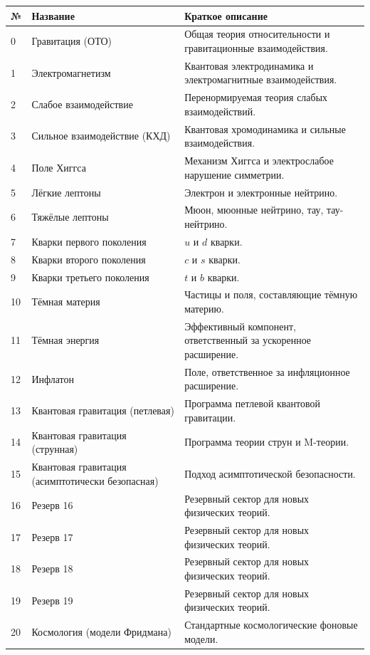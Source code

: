 \documentclass[11pt,a4paper]{article}
\begin{document}
	\begin{longtable}{|p{0.9cm}|p{6.0cm}|p{8.6cm}|}
		\hline
		\textbf{№} & \textbf{Название} & \textbf{Краткое описание} \\
		\hline
		\endhead
		0 & Гравитация (ОТО) & Общая теория относительности и гравитационные взаимодействия. \\
		1 & Электромагнетизм & Квантовая электродинамика и электромагнитные взаимодействия. \\
		2 & Слабое взаимодействие & Перенормируемая теория слабых взаимодействий. \\
		3 & Сильное взаимодействие (КХД) & Квантовая хромодинамика и сильные взаимодействия. \\
		4 & Поле Хиггса & Механизм Хиггса и электрослабое нарушение симметрии. \\
		5 & Лёгкие лептоны & Электрон и электронные нейтрино. \\
		6 & Тяжёлые лептоны & Мюон, мюонные нейтрино, тау, тау-нейтрино. \\
		7 & Кварки первого поколения & $u$ и $d$ кварки. \\
		8 & Кварки второго поколения & $c$ и $s$ кварки. \\
		9 & Кварки третьего поколения & $t$ и $b$ кварки. \\
		10 & Тёмная материя & Частицы и поля, составляющие тёмную материю. \\
		11 & Тёмная энергия & Эффективный компонент, ответственный за ускоренное расширение. \\
		12 & Инфлатон & Поле, ответственное за инфляционное расширение. \\
		13 & Квантовая гравитация (петлевая) & Программа петлевой квантовой гравитации. \\
		14 & Квантовая гравитация (струнная) & Программа теории струн и M-теории. \\
		15 & Квантовая гравитация (асимптотически безопасная) & Подход асимптотической безопасности. \\
		16 & Резерв 16 & Резервный сектор для новых физических теорий. \\
		17 & Резерв 17 & Резервный сектор для новых физических теорий. \\
		18 & Резерв 18 & Резервный сектор для новых физических теорий. \\
		19 & Резерв 19 & Резервный сектор для новых физических теорий. \\
		20 & Космология (модели Фридмана) & Стандартные космологические фоновые модели. \\

\end{longtable}
\end{document}
